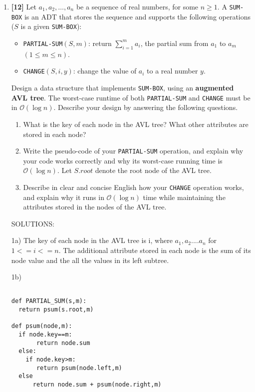 \documentclass{assignment-263}
\begin{document}
\think
\begin{enumerate}
	\item \textbf{[12]} Let $a_1, a_2, \dots, a_n$ be a sequence of real
		numbers, for some $n \ge 1$.  A \texttt{SUM-BOX} is an ADT that
		stores the sequence and supports the following operations ($S$ is a
		given \texttt{SUM-BOX}):
		\begin{itemize}

			\item \texttt{PARTIAL-SUM}$(S, m)$: return $\sum_{i=1}^m a_i$,
				the partial sum from $a_1$ to $a_m$ $(1\le m\le n)$.

			\item \texttt{CHANGE}$(S, i, y)$: change the value of $a_i$ to a
				real number $y$.

		\end{itemize}
		Design a data structure that implements \texttt{SUM-BOX}, using an
		\textbf{augmented AVL tree}. The worst-case runtime of both
		\texttt{PARTIAL-SUM} and \texttt{CHANGE} must be in
		$\mathcal{O}(\log n)$. Describe your design by answering the
		following questions.
		\begin{enumerate}
			\item What is the key of each node in the AVL tree? What other
				attributes are stored in each node?

			\item Write the pseudo-code of your \texttt{PARTIAL-SUM}
				operation, and explain why your code works correctly and why
				its worst-case running time is $\mathcal{O}(\log n)$. Let
				$S.\textit{root}$ denote the root node of the AVL tree.

			\item Describe in clear and concise English how your
				\texttt{CHANGE} operation works, and explain why it runs in
				$\mathcal{O}(\log n)$ time while maintaining the attributes
				stored in the nodes of the AVL tree.
		\end{enumerate}

SOLUTIONS:

1a) The key of each node in the AVL tree is i, where  $a_1,a_2....a_n$ for $1<= i <= n$. The additional attribute stored in each node is the sum of its node value and the all the values in its left subtree.


\vskip 10pt
1b) \begin{verbatim}

def PARTIAL_SUM(s,m):
  return psum(s.root,m)

def psum(node,m):
  if node.key==m:
       return node.sum
  else:
    if node.key>m:
       return psum(node.left,m)
  else
      return node.sum + psum(node.right,m)
	

\end{verbatim}
\end{enumerate}
\end{document}
